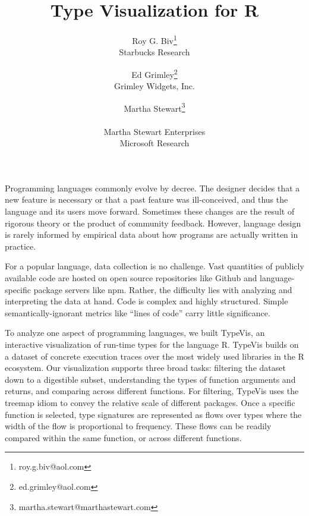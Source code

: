 \documentclass{vgtc}                          %
\title{Type Visualization for R}
\author{Roy G. Biv\thanks{roy.g.biv@aol.com}\\ %
        \scriptsize Starbucks Research %
\and Ed Grimley\thanks{ed.grimley@aol.com}\\ %
     \scriptsize Grimley Widgets, Inc. %
\and Martha Stewart\thanks{martha.stewart@marthastewart.com}\\ %
     \parbox{1.4in}{\scriptsize \centering Martha Stewart Enterprises \\ Microsoft Research}}
\begin{document}


\maketitle


Programming languages commonly evolve by decree. The designer
decides that a new feature is necessary or that a past feature was
ill-conceived, and thus the language and its users move forward.
Sometimes these changes are the result of rigorous theory
or the product of community feedback. However, language design is
rarely informed by empirical data about how programs are actually
written in practice.

For a popular language, data collection is no challenge. Vast
quantities of publicly available code are hosted on open source
repositories like Github and language-specific package servers like npm.
Rather, the difficulty lies with analyzing and interpreting the data
at hand. Code is complex and highly structured. Simple
semantically-ignorant metrics like ``lines of code''
carry little significance.

To analyze one aspect of programming languages, we built {\sc TypeVis},
an interactive visualization of run-time types for the language R.
{\sc TypeVis} builds on a dataset of concrete execution traces
over the most widely used libraries in the R ecosystem.
Our visualization supports three broad tasks:
filtering the dataset down to a digestible subset,
understanding the types of function arguments and returns,
and comparing across different functions.
For filtering, {\sc TypeVis} uses the treemap idiom
to convey the relative scale of different packages.
Once a specific function is selected,
type signatures are represented as flows over types
where the width of the flow is proportional to frequency.
These flows can be readily compared within the same function,
or across different functions.
\end{document}
